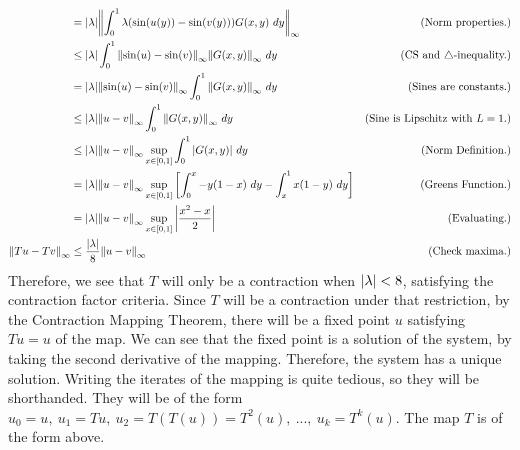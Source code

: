 \begin{solution}
\begin{align*}
        &= |\mathrm{\lambda}|\norm{\int_0^1 \mathrm{\lambda} (\sin(u(y)) - \sin(v(y))) G(x, y) \ dy}_\infty &\text{(Norm properties.)}\\
        &\leq |\mathrm{\lambda}| \int_0^1 \norm{\sin(u) - \sin(v)}_\infty \norm{G(x, y)}_\infty \ dy &\text{(CS and $\triangle$-inequality.)}\\
        &= |\mathrm{\lambda}| \norm{\sin(u) - \sin(v)}_\infty\int_0^1 \norm{G(x, y)}_\infty \ dy &\text{(Sines are constants.)}\\
        &\leq |\mathrm{\lambda}| \norm{u - v}_\infty \int_0^1 \norm{G(x, y)}_\infty \ dy &\text{(Sine is Lipschitz with $L = 1$.)}\\
        &\leq |\mathrm{\lambda}| \norm{u - v}_\infty \sup_{x \in [0, 1]}\int_0^1 |G(x, y)| \ dy &\text{(Norm Definition.)}\\
        &= |\mathrm{\lambda}| \norm{u - v}_\infty \sup_{x \in [0, 1]}\left[ \int_0^x -y(1 - x) \ dy - \int_x^1 x(1 - y) \ dy \right] &\text{(Greens Function.)}\\
        &= |\mathrm{\lambda}| \norm{u - v}_\infty \sup_{x \in [0, 1]} \left|\frac{x^2 - x}{2}\right|  &\text{(Evaluating.)}\\
        \norm{Tu - Tv}_\infty&\leq \frac{|\mathrm{\lambda}|}{8} \norm{u - v}_\infty  &\text{(Check maxima.)}
    \end{align*}
    \vspace{-6mm}\alignbreak
    Therefore, we see that $T$ will only be a contraction when $|\mathrm{\lambda}| < 8$, satisfying the contraction factor criteria. Since $T$ will be a contraction under that restriction, by the Contraction Mapping Theorem, there will be a fixed point $u$ satisfying $Tu = u$ of the map. We can see that the fixed point is a solution of the system, by taking the second derivative of the mapping. Therefore, the system has a unique solution. Writing the iterates of the mapping is quite tedious, so they will be shorthanded. They will be of the form $u_0 = u,\  u_1 = Tu,\ u_2 = T(T(u)) = T^2(u), \ ..., \ u_k = T^k(u).$ The map $T$ is of the form above.
\end{solution}
